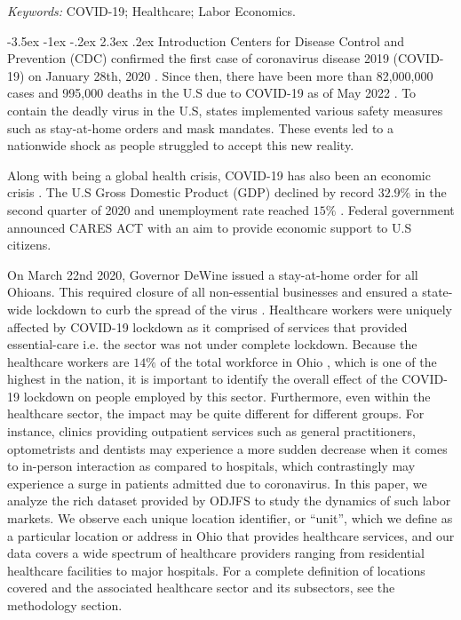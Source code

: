 \documentclass[11pt]{article}
\makeatletter
\renewcommand\section{\@startsection {section}{1}{\z@}%
                                       {-3.5ex \@plus -1ex \@minus -.2ex}%
                                       {2.3ex \@plus.2ex}%
                                       {\normalfont\fontfamily{phv}\fontsize{16}{19}\bfseries}}
\makeatother
\begin{document}
	\noindent%
	{\it Keywords:} COVID-19; Healthcare; Labor Economics.



\section{Introduction} \label{s:intro}
Centers for Disease Control and Prevention (CDC) confirmed the first case of coronavirus disease 2019 (COVID-19) on January 28th, 2020 \cite{CDCcase1}. Since then, there have been more than 82,000,000 cases and 995,000 deaths in the U.S due to COVID-19 as of May 2022 \cite{CDCtracker}. To contain the deadly virus in the U.S, states implemented various safety measures such as stay-at-home orders and mask mandates. These events led to a nationwide shock as people struggled to accept this new reality.

Along with being a global health crisis, COVID-19 has also been an economic crisis \cite{Adams-Prassl2020-ya}.
The U.S Gross Domestic Product (GDP) declined by record $32.9\%$ in the second quarter of 2020 \cite{BEAgdp} and unemployment rate reached $15\%$ \cite{BLSunemp}. Federal government announced CARES ACT with an aim to provide economic support to U.S citizens. 

On March 22nd 2020, Governor DeWine issued a stay-at-home order for all Ohioans. This required closure of all non-essential businesses and ensured a state-wide lockdown to curb the spread of the virus \cite{ODHorder}. Healthcare workers were uniquely affected by COVID-19 lockdown as it comprised of services that provided essential-care i.e. the sector was not under complete lockdown. Because the healthcare workers are $14\%$ of the total workforce in Ohio \cite{healthpct}, which is one of the highest in the nation, it is important to identify the overall effect of the COVID-19 lockdown on people employed by this sector. Furthermore, even within the healthcare sector, the impact may be quite different for different groups. For instance, clinics providing outpatient services such as general practitioners, optometrists and dentists may experience a more sudden decrease when it comes to in-person interaction as compared to hospitals, which contrastingly may experience a surge in patients admitted due to coronavirus. In this paper, we analyze the rich dataset provided by ODJFS to study the dynamics of such labor markets. We observe each unique location identifier, or “unit”, which we define as a particular location or address in Ohio that provides healthcare services, and our data covers a wide spectrum of healthcare providers ranging from residential healthcare facilities to major hospitals. For a complete definition of locations covered and the associated healthcare sector and its subsectors, see the methodology section.
\end{document}

